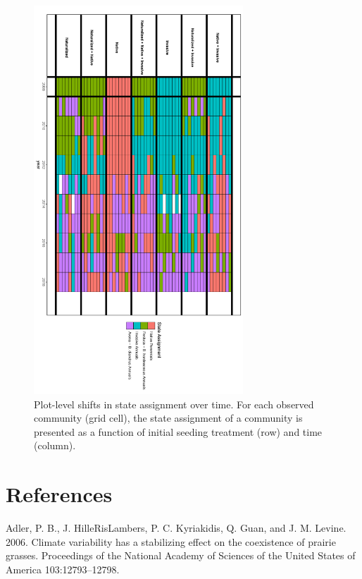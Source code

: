 \documentclass[twoside,12pt,final]{ucthesis-CA2012}
\begin{document}
\begin{ucmainmatter}
\begin{figure}
\includegraphics[width=0.7\textwidth,height=0.85\textheight]{figure/AppFig3_3.png}
\caption{Plot-level shifts in state assignment over time. For each observed community (grid cell), the state assignment of a community is presented as a function of initial seeding treatment (row) and time (column). \label{app-3-3}}
\end{figure}
\backmatter

\hypertarget{references}{%
\chapter*{References}\label{references}}


\noindent

\setlength{\parindent}{-0.20in}
\setlength{\leftskip}{0.20in}
\setlength{\parskip}{8pt}

\hypertarget{refs}{}
\leavevmode\hypertarget{ref-Adler2006}{}%
Adler, P. B., J. HilleRisLambers, P. C. Kyriakidis, Q. Guan, and J. M. Levine. 2006. Climate variability has a stabilizing effect on the coexistence of prairie grasses. Proceedings of the National Academy of Sciences of the United States of America 103:12793--12798.


\end{ucmainmatter}
\end{document}
